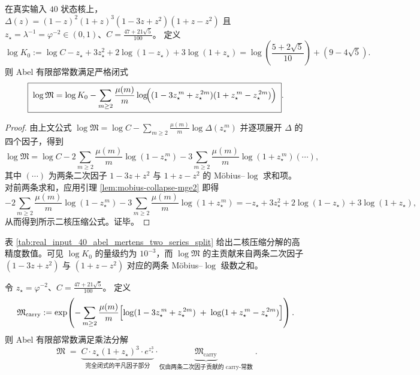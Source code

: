 \begin{proposition}\label{prop:real-input-40-mertens-two-series}
在真实输入 $40$ 状态核上，
\(
\Delta(z)=(1-z)^2(1+z)^3(1-3z+z^2)(1+z-z^2)
\)
且 \(z_\star=\lambda^{-1}=\varphi^{-2}\in(0,1)\)、\(C=\frac{47+21\sqrt5}{100}\)。
定义
\[
\log K_0
:=\log C-z_\star+3z_\star^2+2\log(1-z_\star)+3\log(1+z_\star)
=\log\!\left(\frac{5+2\sqrt5}{10}\right)+(9-4\sqrt5).
\]
则 Abel 有限部常数满足严格闭式
\[
\boxed{\;
\log\mathfrak{M}
=
\log K_0
-\sum_{m\ge 2}\frac{\mu(m)}{m}
\log\!\Bigl(
(1-3z_\star^{\,m}+z_\star^{\,2m})(1+z_\star^{\,m}-z_\star^{\,2m})
\Bigr)\; }.
\]
\end{proposition}
\begin{proof}
由上文公式
\(
\log\mathfrak{M}
=\log C-\sum_{m\ge 2}\frac{\mu(m)}{m}\log \Delta(z_\star^{\,m})
\)
并逐项展开 \(\Delta\) 的四个因子，得到
\[
\log\mathfrak{M}
=\log C
-2\sum_{m\ge 2}\frac{\mu(m)}{m}\log(1-z_\star^{\,m})
-3\sum_{m\ge 2}\frac{\mu(m)}{m}\log(1+z_\star^{\,m})
(\cdots),
\]
其中 \((\cdots)\) 为两条二次因子 \(1-3z+z^2\) 与 \(1+z-z^2\) 的 Möbius--$\log$ 求和项。
对前两条求和，应用引理 \ref{lem:mobius-collapse-mge2} 即得
\[
-2\sum_{m\ge 2}\frac{\mu(m)}{m}\log(1-z_\star^{\,m})
-3\sum_{m\ge 2}\frac{\mu(m)}{m}\log(1+z_\star^{\,m})
=-z_\star+3z_\star^2+2\log(1-z_\star)+3\log(1+z_\star),
\]
从而得到所示二核压缩公式。证毕。
\end{proof}

\begin{remark}\label{rem:real-input-40-mertens-two-series-numeric}
表 \ref{tab:real_input_40_abel_mertens_two_series_split} 给出二核压缩分解的高精度数值。可见
\(\log K_0\) 的量级约为 \(10^{-3}\)，而 \(\log\mathfrak{M}\) 的主贡献来自两条二次因子
\((1-3z+z^2)\) 与 \((1+z-z^2)\) 对应的两条 Möbius--$\log$ 级数之和。

\end{remark}

\begin{theorem}\label{thm:real-input-40-carry-constant}
令 \(z_\star=\varphi^{-2}\)、\(C=\frac{47+21\sqrt5}{100}\)。
定义
\[
\mathfrak{M}_{\mathrm{carry}}
:=\exp\!\left(
-\sum_{m\ge 2}\frac{\mu(m)}{m}
\Bigl[
\log(1-3z_\star^{\,m}+z_\star^{\,2m})
\;+\;
\log(1+z_\star^{\,m}-z_\star^{\,2m})
\Bigr]\right).
\]
则 Abel 有限部常数满足乘法分解
\[
\boxed{\;
\mathfrak{M}
\;=\;
\underbrace{C\cdot z_\star(1+z_\star)^3\cdot e^{z_\star^3}}_{\text{完全闭式的平凡因子部分}}
\cdot
\underbrace{\mathfrak{M}_{\mathrm{carry}}}_{\text{仅由两条二次因子贡献的 carry-常数}}\; }.
\]
\end{theorem}

